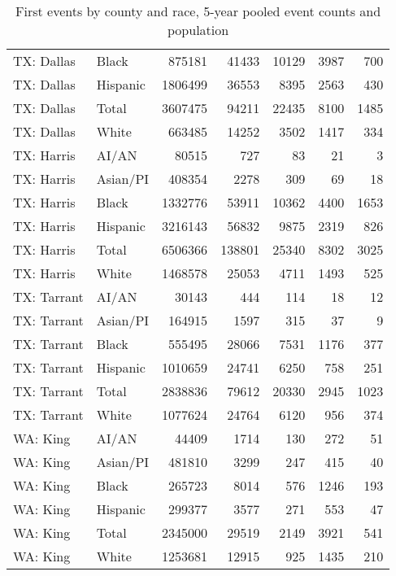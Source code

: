 \begin{table}[ht]
\begin{tabular}{llrrrrr}
  TX: Dallas & Black & 875181 & 41433 & 10129 & 3987 & 700 \\ 
  TX: Dallas & Hispanic & 1806499 & 36553 & 8395 & 2563 & 430 \\ 
  TX: Dallas & Total & 3607475 & 94211 & 22435 & 8100 & 1485 \\ 
  TX: Dallas & White & 663485 & 14252 & 3502 & 1417 & 334 \\ 
  TX: Harris & AI/AN & 80515 & 727 & 83 & 21 & 3 \\ 
  TX: Harris & Asian/PI & 408354 & 2278 & 309 & 69 & 18 \\ 
  TX: Harris & Black & 1332776 & 53911 & 10362 & 4400 & 1653 \\ 
  TX: Harris & Hispanic & 3216143 & 56832 & 9875 & 2319 & 826 \\ 
  TX: Harris & Total & 6506366 & 138801 & 25340 & 8302 & 3025 \\ 
  TX: Harris & White & 1468578 & 25053 & 4711 & 1493 & 525 \\ 
  TX: Tarrant & AI/AN & 30143 & 444 & 114 & 18 & 12 \\ 
  TX: Tarrant & Asian/PI & 164915 & 1597 & 315 & 37 & 9 \\ 
  TX: Tarrant & Black & 555495 & 28066 & 7531 & 1176 & 377 \\ 
  TX: Tarrant & Hispanic & 1010659 & 24741 & 6250 & 758 & 251 \\ 
  TX: Tarrant & Total & 2838836 & 79612 & 20330 & 2945 & 1023 \\ 
  TX: Tarrant & White & 1077624 & 24764 & 6120 & 956 & 374 \\ 
  WA: King & AI/AN & 44409 & 1714 & 130 & 272 & 51 \\ 
  WA: King & Asian/PI & 481810 & 3299 & 247 & 415 & 40 \\ 
  WA: King & Black & 265723 & 8014 & 576 & 1246 & 193 \\ 
  WA: King & Hispanic & 299377 & 3577 & 271 & 553 & 47 \\ 
  WA: King & Total & 2345000 & 29519 & 2149 & 3921 & 541 \\ 
  WA: King & White & 1253681 & 12915 & 925 & 1435 & 210 \\ 
   \hline
\end{tabular}
\caption{First events by county and race, 5-year pooled event counts and population} 
\end{table}
